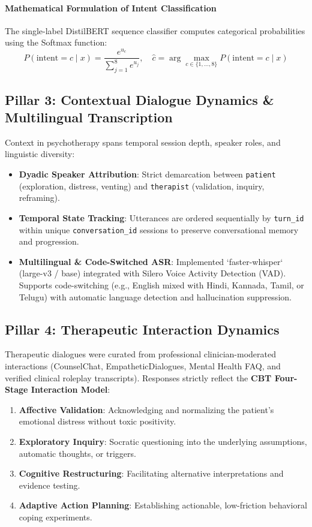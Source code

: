 \documentclass[11pt,a4paper]{article}
\begin{document}
\paragraph{Mathematical Formulation of Intent Classification}
The single-label DistilBERT sequence classifier computes categorical probabilities using the Softmax function:
\begin{equation}
  P(\text{intent} = c \mid x) = \frac{e^{u_c}}{\sum_{j=1}^8 e^{u_j}}, \quad \hat{c} = \arg\max_{c \in \{1,\dots,8\}} P(\text{intent} = c \mid x)
\end{equation}

\subsection{Pillar 3: Contextual Dialogue Dynamics \& Multilingual Transcription}
Context in psychotherapy spans temporal session depth, speaker roles, and linguistic diversity:
\begin{itemize}[leftmargin=*, label=\color{clinicalteal}$\checkmark$]
  \item \textbf{Dyadic Speaker Attribution}: Strict demarcation between \texttt{patient} (exploration, distress, venting) and \texttt{therapist} (validation, inquiry, reframing).
  \item \textbf{Temporal State Tracking}: Utterances are ordered sequentially by \texttt{turn\_id} within unique \texttt{conversation\_id} sessions to preserve conversational memory and progression.
  \item \textbf{Multilingual \& Code-Switched ASR}: Implemented `faster-whisper` (large-v3 / base) integrated with Silero Voice Activity Detection (VAD). Supports code-switching (e.g., English mixed with Hindi, Kannada, Tamil, or Telugu) with automatic language detection and hallucination suppression.
\end{itemize}

\subsection{Pillar 4: Therapeutic Interaction Dynamics}
Therapeutic dialogues were curated from professional clinician-moderated interactions (CounselChat, EmpatheticDialogues, Mental Health FAQ, and verified clinical roleplay transcripts). Responses strictly reflect the \textbf{CBT Four-Stage Interaction Model}:
\begin{enumerate}[label=\color{primaryblue}\textbf{Stage \arabic*:}, leftmargin=*]
  \item \textbf{Affective Validation}: Acknowledging and normalizing the patient's emotional distress without toxic positivity.
  \item \textbf{Exploratory Inquiry}: Socratic questioning into the underlying assumptions, automatic thoughts, or triggers.
  \item \textbf{Cognitive Restructuring}: Facilitating alternative interpretations and evidence testing.
  \item \textbf{Adaptive Action Planning}: Establishing actionable, low-friction behavioral coping experiments.
\end{enumerate}
\end{document}
